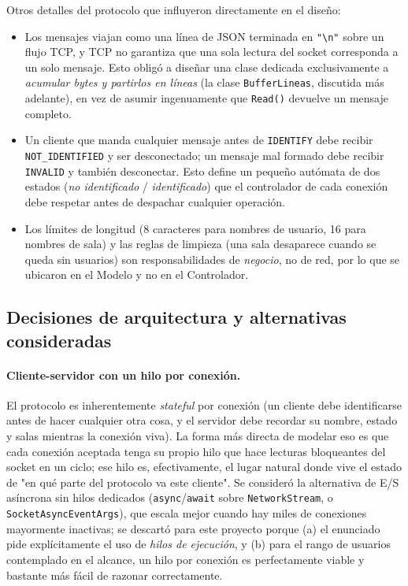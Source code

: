 \documentclass[11pt,letterpaper]{article}
\begin{document}
Otros detalles del protocolo que influyeron directamente en el diseño:

\begin{itemize}
  \item Los mensajes viajan como una línea de JSON terminada en \texttt{"\textbackslash n"}
        sobre un flujo TCP, y TCP no garantiza que una sola lectura del
        socket corresponda a un solo mensaje. Esto obligó a diseñar una
        clase dedicada exclusivamente a \emph{acumular bytes y partirlos en
        líneas} (la clase \texttt{BufferLineas}, discutida más adelante),
        en vez de asumir ingenuamente que \texttt{Read()} devuelve un
        mensaje completo.
  \item Un cliente que manda cualquier mensaje antes de \texttt{IDENTIFY}
        debe recibir \texttt{NOT\_IDENTIFIED} y ser desconectado; un mensaje
        mal formado debe recibir \texttt{INVALID} y también desconectar.
        Esto define un pequeño autómata de dos estados (\emph{no
        identificado} / \emph{identificado}) que el controlador de cada
        conexión debe respetar antes de despachar cualquier operación.
  \item Los límites de longitud (8 caracteres para nombres de usuario, 16
        para nombres de sala) y las reglas de limpieza (una sala
        desaparece cuando se queda sin usuarios) son responsabilidades de
        \emph{negocio}, no de red, por lo que se ubicaron en el Modelo y no
        en el Controlador.
\end{itemize}

\subsection{Decisiones de arquitectura y alternativas consideradas}

\paragraph{Cliente-servidor con un hilo por conexión.} El protocolo es
inherentemente \emph{stateful} por conexión (un cliente debe identificarse
antes de hacer cualquier otra cosa, y el servidor debe recordar su nombre,
estado y salas mientras la conexión viva). La forma más directa de
modelar eso es que cada conexión aceptada tenga su propio hilo que hace
lecturas bloqueantes del socket en un ciclo; ese hilo es, efectivamente, el
lugar natural donde vive el estado de "en qué parte del protocolo va este
cliente". Se consideró la alternativa de E/S asíncrona sin hilos dedicados
(\texttt{async}/\texttt{await} sobre \texttt{NetworkStream}, o
\texttt{SocketAsyncEventArgs}), que escala mejor cuando hay miles de
conexiones mayormente inactivas; se descartó para este proyecto porque (a)
el enunciado pide explícitamente el uso de \emph{hilos de ejecución}, y (b)
para el rango de usuarios contemplado en el alcance, un hilo por conexión
es perfectamente viable y bastante más fácil de razonar correctamente.
\end{document}
